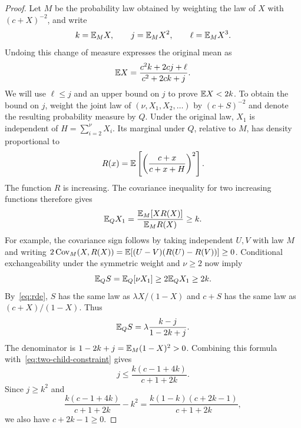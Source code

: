 \begin{proof}
Let $M$ be the probability law obtained by weighting the law of $X$ with $(c+X)^{-2}$, and write
\begin{equation}\label{eq:tilted-moments}
 k=\mathbb E_M X,\qquad j=\mathbb E_M X^2,\qquad \ell=\mathbb E_M X^3.
\end{equation}
Undoing this change of measure expresses the original mean as
\begin{equation}\label{eq:untilted-mean}
 \mathbb E X=\frac{c^2k+2cj+\ell}{c^2+2ck+j}.
\end{equation}
We will use $\ell\le j$ and an upper bound on $j$ to prove $\mathbb E X<2k$. To obtain the bound on $j$, weight the joint law of $(\nu,X_1,X_2,\ldots)$ by $(c+S)^{-2}$ and denote the resulting probability measure by $Q$. Under the original law, $X_1$ is independent of $H=\sum_{i=2}^{\nu}X_i$. Its marginal under $Q$, relative to $M$, has density proportional to
\begin{equation*}
 R(x)=\mathbb E\left[\left(\frac{c+x}{c+x+H}\right)^2\right].
\end{equation*}
The function $R$ is increasing. The covariance inequality for two increasing functions therefore gives
\begin{equation*}
 \mathbb E_QX_1=\frac{\mathbb E_M[XR(X)]}{\mathbb E_MR(X)}\ge k.
\end{equation*}
For example, the covariance sign follows by taking independent $U,V$ with law $M$ and writing $2\operatorname{Cov}_M(X,R(X))=\mathbb E[(U-V)(R(U)-R(V))]\ge0$. Conditional exchangeability under the symmetric weight and $\nu\ge2$ now imply
\begin{equation}\label{eq:two-child-constraint}
 \mathbb E_QS=\mathbb E_Q[\nu X_1]\ge2\mathbb E_QX_1\ge2k.
\end{equation}
By~\eqref{eq:rde}, $S$ has the same law as $\lambda X/(1-X)$ and $c+S$ has the same law as $(c+X)/(1-X)$. Thus
\begin{equation*}
 \mathbb E_QS=\lambda\frac{k-j}{1-2k+j}.
\end{equation*}
The denominator is $1-2k+j=\mathbb E_M(1-X)^2>0$. Combining this formula with~\eqref{eq:two-child-constraint} gives
\begin{equation}\label{eq:two-j-bound}
 j\le\frac{k(c-1+4k)}{c+1+2k}.
\end{equation}
Since $j\ge k^2$ and
\begin{equation*}
 \frac{k(c-1+4k)}{c+1+2k}-k^2
 =\frac{k(1-k)(c+2k-1)}{c+1+2k},
\end{equation*}
we also have $c+2k-1\ge0$.


\end{proof}
